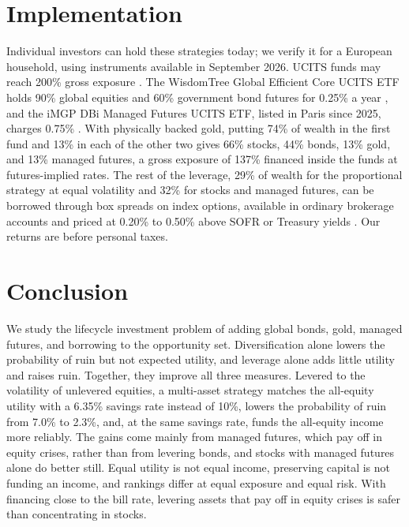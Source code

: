 \documentclass[12pt]{article}
\newif\ifsubmission
\newcommand{\exhibitlist}{}
\begin{document}
\section{Implementation}
\label{sec:implementation}

Individual investors can hold these strategies today; we verify it for a European household, using
instruments available in September 2026. UCITS funds may reach 200\% gross exposure
\citep{ESMAGlobalExposure2010}. The WisdomTree Global Efficient Core UCITS ETF holds 90\% global equities
and 60\% government bond futures for 0.25\% a year \citep{WisdomTreeNTSG2026}, and the iMGP DBi Managed
Futures UCITS ETF, listed in Paris since 2025, charges 0.75\% \citep{iMGPDBMF2025}. With physically backed
gold, putting 74\% of wealth in the first fund and 13\% in each of the other two gives 66\% stocks, 44\%
bonds, 13\% gold, and 13\% managed futures, a gross exposure of 137\% financed inside the funds at
futures-implied rates. The rest of the leverage, 29\% of wealth for the proportional strategy at equal
volatility and 32\% for stocks and managed futures, can be borrowed through box spreads on index options,
available in ordinary brokerage accounts and priced at 0.20\% to 0.50\% above SOFR or Treasury yields
\citep{CMEBoxFinancing2024,WangBoxFinancing2025}. Our returns are before personal taxes.

\section{Conclusion}

We study the lifecycle investment problem of \citet{AnarkulovaCederburgODoherty2025} adding global bonds, gold, managed futures, and borrowing to the opportunity set. Diversification alone lowers the probability of ruin but not expected utility, and leverage alone adds
little utility and raises ruin. Together, they improve all three measures. Levered to the
volatility of unlevered equities, a multi-asset strategy matches the all-equity utility with a 6.35\%
savings rate instead of 10\%, lowers the probability of ruin from 7.0\% to 2.3\%, and, at the same savings
rate, funds the all-equity income more reliably. The gains come mainly from managed futures, which pay off in equity crises, rather than from levering
bonds, and stocks with managed futures alone do better still. Equal utility is not equal income, preserving capital is not funding an income, and
rankings differ at equal exposure and equal risk. With financing close to the bill rate, levering assets that pay off in equity crises is safer than concentrating in stocks.

\ifsubmission\else\clearpage\fi
\singlespacing
\printbibliography[title={References}]

\ifsubmission
\clearpage
\exhibitlist
\fi
\end{document}
